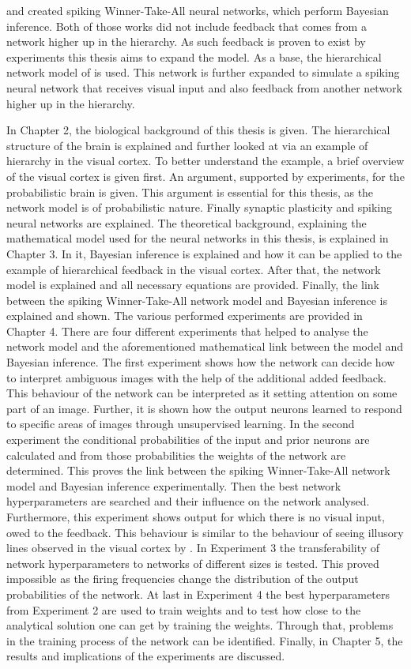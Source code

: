 \citet{nessler} and \citet{nesslerClone} created spiking Winner-Take-All  neural networks, which perform Bayesian inference. Both of those works did not include feedback that comes from a network higher up in the hierarchy. As such feedback is proven to exist by experiments this thesis aims to expand the model. As a base, the hierarchical network model of \citet{nessler} is used. This network is further expanded to simulate a spiking neural network that receives visual input and also feedback from another network higher up in the hierarchy.

In Chapter 2, the biological background of this thesis is given. The hierarchical structure of the brain is explained and further looked at via an example of hierarchy in the visual cortex. To better understand the example, a brief overview of the visual cortex is given first. An argument, supported by experiments, for the probabilistic brain is given. This argument is essential for this thesis, as the network model is of probabilistic nature. Finally synaptic plasticity and spiking neural networks are explained.
The theoretical background, explaining the mathematical model used for the neural networks in this thesis, is explained in Chapter 3. In it, Bayesian inference is explained and how it can be applied to the example of hierarchical feedback in the visual cortex. After that, the network model  is explained and all necessary equations are provided. Finally, the link between the spiking Winner-Take-All network model and Bayesian inference is explained and shown.
The various performed experiments are provided in Chapter 4. There are four different experiments that helped to analyse the network model and the aforementioned mathematical link between the model and Bayesian inference. The first experiment shows how the network can decide how to interpret ambiguous images with the help of the additional added feedback. This behaviour of the network can be interpreted as it setting attention on some part of an image. Further, it is shown how the output neurons learned to respond to specific areas of images through unsupervised learning. In the second experiment the conditional probabilities of the input and prior neurons are calculated and from those probabilities the weights of the network are determined. This proves the link between the spiking Winner-Take-All network model and Bayesian inference experimentally. Then the best network hyperparameters are searched and their influence on the network analysed. Furthermore, this experiment shows output for which there is no visual input, owed to the feedback. This behaviour is similar to the behaviour of seeing illusory lines observed in the visual cortex by \citet{HierachicalBayesVisualCortex}. In Experiment 3 the transferability of network hyperparameters to networks of different sizes is tested. This proved impossible as the firing frequencies change the distribution of the output probabilities of the network. At last in Experiment 4 the best hyperparameters from Experiment 2 are used to train weights and to test how close to the analytical solution one can get by training the weights. Through that, problems in the training process of the network can be identified.
Finally, in Chapter 5, the results and implications of the experiments are discussed.